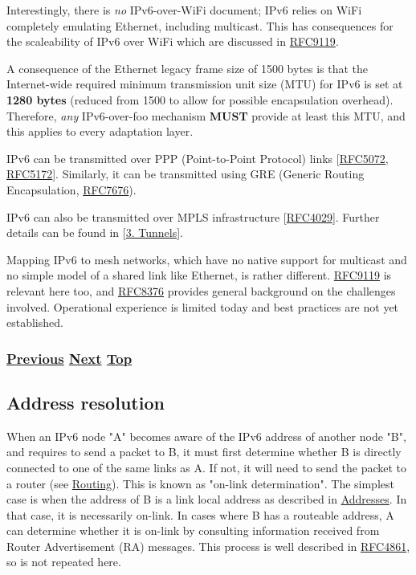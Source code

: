 \documentclass[
]{article}
\begin{document}
Interestingly, there is \emph{no} IPv6-over-WiFi document; IPv6 relies
on WiFi completely emulating Ethernet, including multicast. This has
consequences for the scaleability of IPv6 over WiFi which are discussed
in \href{https://www.rfc-editor.org/info/rfc9119}{RFC9119}.

A consequence of the Ethernet legacy frame size of 1500 bytes is that
the Internet-wide required minimum transmission unit size (MTU) for IPv6
is set at \textbf{1280 bytes} (reduced from 1500 to allow for possible
encapsulation overhead). Therefore, \emph{any} IPv6-over-foo mechanism
\textbf{MUST} provide at least this MTU, and this applies to every
adaptation layer.

IPv6 can be transmitted over PPP (Point-to-Point Protocol) links
{[}\href{https://www.rfc-editor.org/info/rfc5072}{RFC5072},
\href{https://www.rfc-editor.org/info/rfc5172}{RFC5172}{]}. Similarly,
it can be transmitted using GRE (Generic Routing Encapsulation,
\href{https://www.rfc-editor.org/info/rfc7676}{RFC7676}).

IPv6 can also be transmitted over MPLS infrastructure
{[}\href{https://www.rfc-editor.org/info/rfc4029}{RFC4029}{]}. Further
details can be found in {[}\hyperref[tunnels]{3. Tunnels}{]}.

Mapping IPv6 to mesh networks, which have no native support for
multicast and no simple model of a shared link like Ethernet, is rather
different. \href{https://www.rfc-editor.org/info/rfc9119}{RFC9119} is
relevant here too, and
\href{https://www.rfc-editor.org/info/rfc8376}{RFC8376} provides general
background on the challenges involved. Operational experience is limited
today and best practices are not yet established.

\subsubsection{\texorpdfstring{\hyperref[addresses]{Previous}
\hyperref[address-resolution]{Next}
\hyperref[ipv6-basic-technology]{Top}}{Previous Next Top}}\label{previous-next-top-8}

\pagebreak

\subsection{Address resolution}\label{address-resolution}

When an IPv6 node "A" becomes aware of the IPv6 address of another node
"B", and requires to send a packet to B, it must first determine whether
B is directly connected to one of the same links as A. If not, it will
need to send the packet to a router (see \hyperref[routing]{Routing}).
This is known as "on-link determination". The simplest case is when the
address of B is a link local address as described in
\hyperref[addresses]{Addresses}. In that case, it is necessarily
on-link. In cases where B has a routeable address, A can determine
whether it is on-link by consulting information received from Router
Advertisement (RA) messages. This process is well described in
\href{https://www.rfc-editor.org/info/rfc4861}{RFC4861}, so is not
repeated here.
\end{document}
